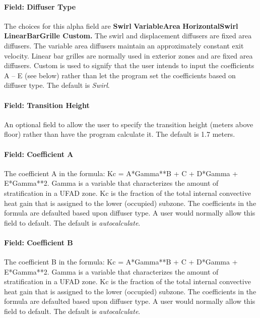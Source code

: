\paragraph{Field: Diffuser Type}\label{field-diffuser-type}

The choices for this alpha field are \textbf{Swirl} \textbar{} \textbf{VariableArea} \textbar{} \textbf{HorizontalSwirl \textbar{} LinearBarGrille \textbar{} Custom.} The swirl and displacement diffusers are fixed area diffusers. The variable area diffusers maintain an approximately constant exit velocity. Linear bar grilles are normally used in exterior zones and are fixed area diffusers. Custom is used to signify that the user intends to input the coefficients A -- E (see below) rather than let the program set the coefficients based on diffuser type. The default is \emph{Swirl}.

\paragraph{Field: Transition Height}\label{field-transition-height}

An optional field to allow the user to specify the transition height (meters above floor) rather than have the program calculate it. The default is 1.7 meters.

\paragraph{Field: Coefficient A}\label{field-coefficient-a}

The coefficient A in the formula: Kc = A*Gamma**B + C + D*Gamma + E*Gamma**2. Gamma is a variable that characterizes the amount of stratification in a UFAD zone. Kc is the fraction of the total internal convective heat gain that is assigned to the lower (occupied) subzone. The coefficients in the formula are defaulted based upon diffuser type. A user would normally allow this field to default. The default is \emph{autocalculate}.

\paragraph{Field: Coefficient B}\label{field-coefficient-b}

The coefficient B in the formula: Kc = A*Gamma**B + C + D*Gamma + E*Gamma**2. Gamma is a variable that characterizes the amount of stratification in a UFAD zone. Kc is the fraction of the total internal convective heat gain that is assigned to the lower (occupied) subzone. The coefficients in the formula are defaulted based upon diffuser type. A user would normally allow this field to default. The default is \emph{autocalculate}.


